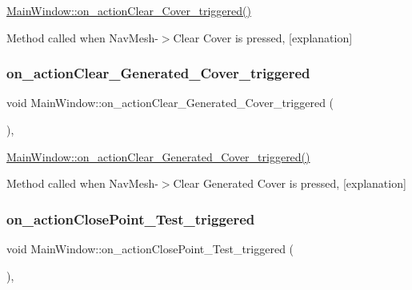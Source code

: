 \hyperlink{class_main_window_aa76285613d70d8f605af173f444232aa}{Main\+Window\+::on\+\_\+action\+Clear\+\_\+\+Cover\+\_\+triggered()} 

Method called when Nav\+Mesh-\/$>$Clear Cover is pressed, \mbox{[}explanation\mbox{]} \mbox{\label{class_main_window_a1c13e2deb928b26279035e49ffb5a381}} 
\subsubsection{\texorpdfstring{on\+\_\+action\+Clear\+\_\+\+Generated\+\_\+\+Cover\+\_\+triggered}{on\_actionClear\_Generated\_Cover\_triggered}}
{\footnotesize\ttfamily void Main\+Window\+::on\+\_\+action\+Clear\+\_\+\+Generated\+\_\+\+Cover\+\_\+triggered (\begin{DoxyParamCaption}{ }\end{DoxyParamCaption})\hspace{0.3cm}{\ttfamily [private]}, {\ttfamily [slot]}}



\hyperlink{class_main_window_a1c13e2deb928b26279035e49ffb5a381}{Main\+Window\+::on\+\_\+action\+Clear\+\_\+\+Generated\+\_\+\+Cover\+\_\+triggered()} 

Method called when Nav\+Mesh-\/$>$Clear Generated Cover is pressed, \mbox{[}explanation\mbox{]} \mbox{\label{class_main_window_a5f7a6767c44f88599408d3494ff7239d}} 
\subsubsection{\texorpdfstring{on\+\_\+action\+Close\+Point\+\_\+\+Test\+\_\+triggered}{on\_actionClosePoint\_Test\_triggered}}
{\footnotesize\ttfamily void Main\+Window\+::on\+\_\+action\+Close\+Point\+\_\+\+Test\+\_\+triggered (\begin{DoxyParamCaption}{ }\end{DoxyParamCaption})\hspace{0.3cm}{\ttfamily [private]}, {\ttfamily [slot]}}



